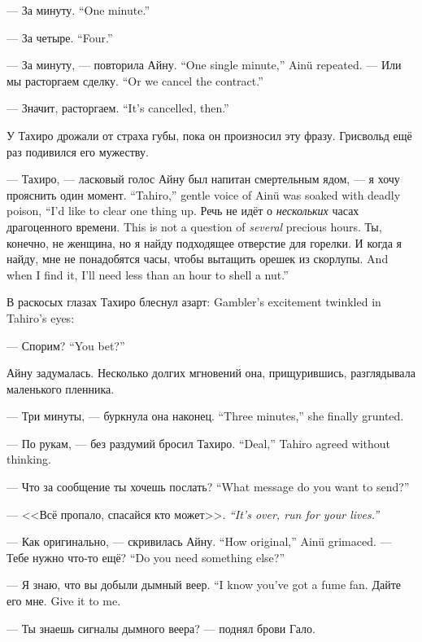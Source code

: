 {--- За минуту.}
{``One minute.''}

{--- За четыре.}
{``Four.''}

{--- За минуту, --- повторила Айну.}
{``One single minute,'' Ain\"{u} repeated.}
{--- Или мы расторгаем сделку.}
{``Or we cancel the contract.''}

{--- Значит, расторгаем.}
{``It's cancelled, then.''}

У Тахиро дрожали от страха губы, пока он произносил эту фразу.
Грисвольд ещё раз подивился его мужеству.

{--- Тахиро, --- ласковый голос Айну был напитан смертельным ядом, --- я хочу прояснить один момент.}
{``Tahiro,'' gentle voice of Ain\"{u} was soaked with deadly poison, ``I'd like to clear one thing up.}
{Речь не идёт о \emph{нескольких} часах драгоценного времени.}
{This is not a question of \emph{several} precious hours.}
Ты, конечно, не женщина, но я найду подходящее отверстие для горелки.
{И когда я найду, мне не понадобятся часы, чтобы вытащить орешек из скорлупы.}
{And when I find it, I'll need less than an hour to shell a nut.''}

{В раскосых глазах Тахиро блеснул азарт:}
{Gambler's excitement twinkled in Tahiro's eyes:}

{--- Спорим?}
{``You bet?''}

Айну задумалась.
Несколько долгих мгновений она, прищурившись, разглядывала маленького пленника.

{--- Три минуты, --- буркнула она наконец.}
{``Three minutes,'' she finally grunted.}

{--- По рукам, --- без раздумий бросил Тахиро.}
{``Deal,'' Tahiro agreed without thinking.}

{--- Что за сообщение ты хочешь послать?}
{``What message do you want to send?''}

{--- <<Всё пропало, спасайся кто может>>.}
{\emph{``It's over, run for your lives.''}}

{--- Как оригинально, --- скривилась Айну.}
{``How original,'' Ain\"{u} grimaced.}
{--- Тебе нужно что-то ещё?}
{``Do you need something else?''}

{--- Я знаю, что вы добыли дымный веер.}
{``I know you've got a fume fan.}
{Дайте его мне.}
{Give it to me.}

--- Ты знаешь сигналы дымного веера? --- поднял брови Гало.


